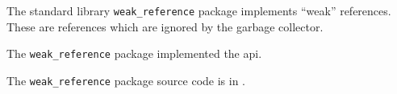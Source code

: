 
The standard library {\tt weak\_reference} package implements ``weak'' references.  These 
are references which are ignored by the garbage collector.

The {\tt weak\_reference} package implemented the  
 api.

The {\tt weak\_reference} package source code is in .
